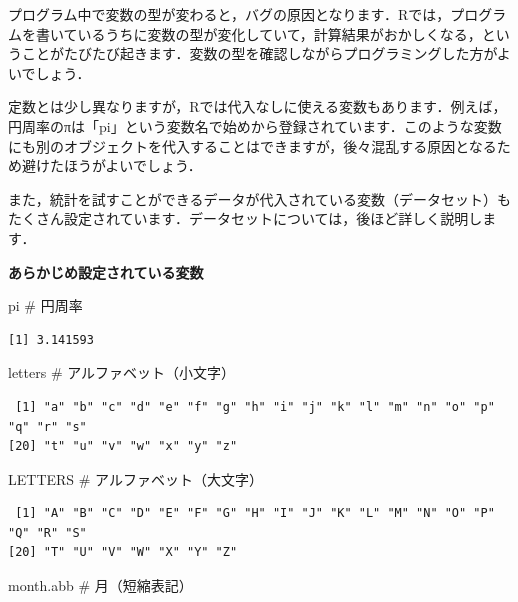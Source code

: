 \documentclass[
  letterpaper,
  DIV=11,
  numbers=noendperiod]{scrreprt}
\newenvironment{Shaded}{\begin{snugshade}}{\end{snugshade}}
\newcommand{\CommentTok}[1]{\textcolor[rgb]{0.37,0.37,0.37}{#1}}
\newcommand{\NormalTok}[1]{\textcolor[rgb]{0.00,0.23,0.31}{#1}}
\begin{document}
プログラム中で変数の型が変わると，バグの原因となります．Rでは，プログラムを書いているうちに変数の型が変化していて，計算結果がおかしくなる，ということがたびたび起きます．変数の型を確認しながらプログラミングした方がよいでしょう．

定数とは少し異なりますが，Rでは代入なしに使える変数もあります．例えば，円周率のπは「pi」という変数名で始めから登録されています．このような変数にも別のオブジェクトを代入することはできますが，後々混乱する原因となるため避けたほうがよいでしょう．

また，統計を試すことができるデータが代入されている変数（データセット）もたくさん設定されています．データセットについては，後ほど詳しく説明します．

\textbf{あらかじめ設定されている変数}

\begin{Shaded}
\begin{Highlighting}[]
\NormalTok{pi }\CommentTok{\# 円周率}
\end{Highlighting}
\end{Shaded}

\begin{verbatim}
[1] 3.141593
\end{verbatim}

\begin{Shaded}
\begin{Highlighting}[]
\NormalTok{letters }\CommentTok{\# アルファベット（小文字）}
\end{Highlighting}
\end{Shaded}

\begin{verbatim}
 [1] "a" "b" "c" "d" "e" "f" "g" "h" "i" "j" "k" "l" "m" "n" "o" "p" "q" "r" "s"
[20] "t" "u" "v" "w" "x" "y" "z"
\end{verbatim}

\begin{Shaded}
\begin{Highlighting}[]
\NormalTok{LETTERS }\CommentTok{\# アルファベット（大文字）}
\end{Highlighting}
\end{Shaded}

\begin{verbatim}
 [1] "A" "B" "C" "D" "E" "F" "G" "H" "I" "J" "K" "L" "M" "N" "O" "P" "Q" "R" "S"
[20] "T" "U" "V" "W" "X" "Y" "Z"
\end{verbatim}

\begin{Shaded}
\begin{Highlighting}[]
\NormalTok{month.abb }\CommentTok{\# 月（短縮表記）}
\end{Highlighting}
\end{Shaded}
\end{document}

